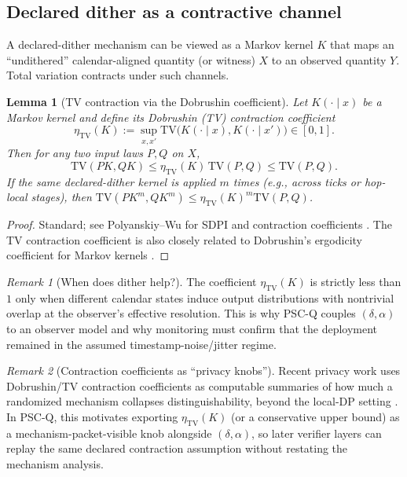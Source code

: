 \documentclass[11pt]{article}
\newtheorem{lemma}{Lemma}
\theoremstyle{definition}
\theoremstyle{remark}
\newtheorem{remark}{Remark}
\newcommand{\TV}{\mathrm{TV}}
\begin{document}
\subsection{Declared dither as a contractive channel}
A declared-dither mechanism can be viewed as a Markov kernel \(K\) that maps an ``undithered'' calendar-aligned quantity (or witness) \(X\) to an observed quantity \(Y\).
Total variation contracts under such channels.

\begin{lemma}[TV contraction via the Dobrushin coefficient]\label{lem:dobrushin}
Let \(K(\cdot\mid x)\) be a Markov kernel and define its Dobrushin (TV) contraction coefficient
\[
\eta_{\TV}(K) := \sup_{x,x'} \TV\big(K(\cdot\mid x),K(\cdot\mid x')\big)\in[0,1].
\]
Then for any two input laws \(P,Q\) on \(X\),
\[
\TV(PK,QK)\le \eta_{\TV}(K)\,\TV(P,Q)\le \TV(P,Q).
\]
If the same declared-dither kernel is applied \(m\) times (e.g., across ticks or hop-local stages), then
\(\TV(PK^{m},QK^{m})\le \eta_{\TV}(K)^{m}\TV(P,Q)\).
\end{lemma}

\begin{proof}
Standard; see Polyanskiy--Wu for SDPI and contraction coefficients \cite{polyanskiy_wu_sdpi}.
The TV contraction coefficient is also closely related to Dobrushin's ergodicity coefficient for Markov kernels \cite{dobrushin1956,delmoral2003}.
\end{proof}

\begin{remark}[When does dither help?]
The coefficient \(\eta_{\TV}(K)\) is strictly less than \(1\) only when different calendar states induce output distributions with nontrivial overlap at the observer's effective resolution.
This is why PSC-Q couples \((\delta,\alpha)\) to an observer model and why monitoring must confirm that the deployment remained in the assumed timestamp-noise/jitter regime.
\end{remark}

\begin{remark}[Contraction coefficients as ``privacy knobs'']
Recent privacy work uses Dobrushin/TV contraction coefficients as computable summaries of how much a randomized mechanism collapses distinguishability, beyond the local-DP setting \cite{grosse2026}.
In PSC-Q, this motivates exporting \(\eta_{\TV}(K)\) (or a conservative upper bound) as a mechanism-packet-visible knob alongside \((\delta,\alpha)\), so later verifier layers can replay the same declared contraction assumption without restating the mechanism analysis.
\end{remark}
\end{document}
